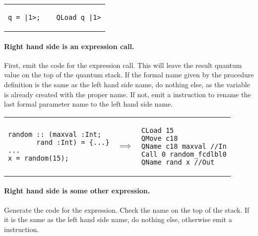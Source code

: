 \begin{center}
\begin{tabular}{p{1in}p{.4in}p{1.5in}}
{\begin{singlespace}
\begin{lstlisting}[style=linqpl]
q = |1>;
\end{lstlisting}
\end{singlespace}}
 & { \raisebox{-1.3em}{$\implies$}} &
{\begin{singlespace}
\begin{lstlisting}[style=linqpl]
     QLoad q |1>
\end{lstlisting}
\end{singlespace}}
\end{tabular}
\end{center}


\paragraph{Right hand side is an expression call.}
First, emit the code for the expression call. This will leave the
result quantum value on the top of the quantum stack. If the
formal name given by the procedure definition is the same as the
left hand side name, do nothing else, as the variable is already
created with the proper name. If not, emit a  instruction
to rename the last formal parameter name to the left hand side name.

\begin{center}
\begin{tabular}{p{2in}p{.3in}p{1.75in}}
{\begin{singlespace}
\begin{lstlisting}[style=linqpl]
random :: (maxval :Int; 
       rand :Int) = {...}
...
x = random(15);
\end{lstlisting}
\end{singlespace}}
 & { \qquad \qquad \quad \quad \qquad \qquad $\implies$} &
{\begin{singlespace}
\begin{lstlisting}[style=linqpl]
CLoad 15
QMove c18
QName c18 maxval //In
Call 0 random_fcdlbl0
QName rand x //Out
\end{lstlisting}
\end{singlespace}}
\end{tabular}
\end{center}


\paragraph{Right hand side is some other expression.}
Generate the code for the expression. Check the name on the top of
the stack. If it is the same as the left hand side name, do nothing else,
otherwise emit a  instruction.


